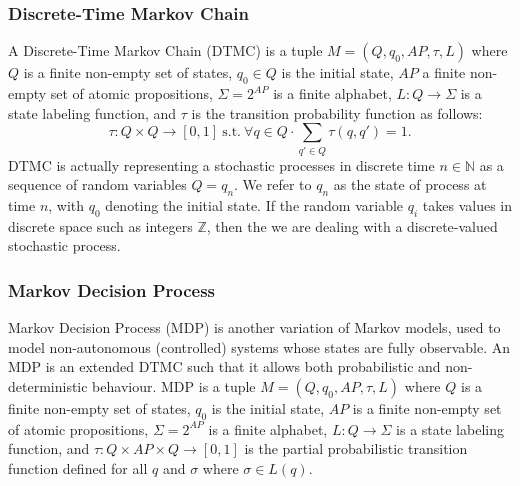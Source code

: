 \documentclass[
a4paper,
12pt
]{scrartcl}
\begin{document}
\subsubsection{Discrete-Time Markov Chain}
\par A Discrete-Time Markov Chain (DTMC) is a tuple $M=(Q,q_0,AP,\tau,L)$ where $Q$ is a finite non-empty set of states, $q_0\in Q$ is the initial state, $AP$ a finite non-empty set of atomic propositions, $\Sigma=2^{AP}$ is a finite alphabet, $L:Q\to \Sigma$ is a state labeling function, and $\tau$ is the transition probability function as follows:
\begin{equation*}
  \tau: Q\times Q \to [0,1]~\text{s.t.}~\forall q \in Q \cdot \sum_{q'\in Q}\tau(q,q')=1.
\end{equation*}
DTMC is actually representing a stochastic processes in discrete time $n \in \mathbb{N}$ as a sequence of random variables $Q={q_n}$. We refer to $q_n$ as the state of process at time $n$, with $q_0$ denoting the initial state. If the random variable $q_i$ takes values in discrete space such as integers $\mathbb{Z}$, then the we are dealing with a discrete-valued stochastic process.
\subsubsection{Markov Decision Process}
Markov Decision Process (MDP) is another variation of Markov models, used to model non-autonomous (controlled) systems whose states are fully observable. An MDP is an extended DTMC such that it allows both probabilistic and non-deterministic behaviour. MDP is a tuple $M=(Q, q_0, AP, \tau, L)$ where $Q$ is a finite non-empty set of states, $q_0$ is the initial state, $AP$ is a finite non-empty set of atomic propositions, $\Sigma = 2^{AP}$ is a finite alphabet, $L:Q \to \Sigma$ is a state labeling function, and $\tau: Q \times AP \times Q \to [0,1]$ is the partial probabilistic transition function defined for all $q$ and $\sigma$ where $\sigma \in L(q)$.
\end{document}

